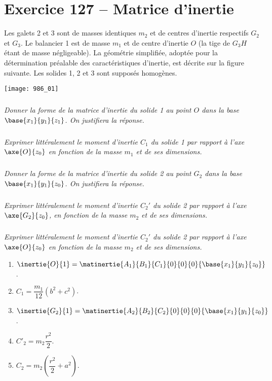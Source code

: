 \section*{Exercice 127 -- Matrice d'inertie}
\setcounter{exo}{0}

Les galets 2 et 3 sont de masses identiques $m_2$ et de centres d’inertie respectifs $G_2$ et $G_3$. Le balancier 1 est
de masse $m_1$ et de centre d’inertie $O$ (la tige de $G_3H$ étant de masse négligeable). La géométrie simplifiée,
adoptée pour la détermination préalable des caractéristiques d'inertie, est décrite sur la figure suivante.
Les solides 1, 2 et 3 sont supposés homogènes.

\begin{center}
\texttt{[image: 986\_01]}%
\end{center}


\subparagraph{}
\textit{Donner la forme de la matrice d’inertie du solide 1 au point $O$ dans la base
$\base{x_1}{y_1}{z_1}$. On justifiera la réponse.}
\ifprof
\begin{corrige}
\end{corrige}
\else
\fi

\subparagraph{}
\textit{Exprimer littéralement le moment d’inertie $C_1$ du solide 1 par rapport à l’axe $\axe{O}{z_0}$
 en fonction de la masse $m_1$ et de ses dimensions.}
\ifprof
\begin{corrige}
\end{corrige}
\else
\fi

\subparagraph{}
\textit{Donner la forme de la matrice d’inertie du solide 2 au point $G_2$ dans la base $\base{x_1}{y_1}{z_0}$. On justifiera la réponse.}
\ifprof
\begin{corrige}
\end{corrige}
\else
\fi

\subparagraph{}
\textit{Exprimer littéralement le moment d’inertie $C_2'$ du solide 2 par rapport à l’axe $\axe{G_2}{z_0}$, en fonction de la masse $m_2$ et de ses dimensions.}
\ifprof
\begin{corrige}
\end{corrige}
\else
\fi

\subparagraph{}
\textit{Exprimer littéralement le moment d’inertie $C_2'$ du solide 2 par rapport à l’axe $\axe{O}{z_0}$ en fonction de la masse $m_2$ et de ses dimensions.}
\ifprof
\begin{corrige}
\end{corrige}
\else
\fi
%

\begin{enumerate}
\item $\inertie{O}{1}=\matinertie{A_1}{B_1}{C_1}{0}{0}{0}{\base{x_1}{y_1}{z_0}}$.
\item $C_1 = \dfrac{m_1}{12}\left( b^2 + c^2\right)$.
\item $\inertie{G_2}{1}=\matinertie{A_2}{B_2}{C_2}{0}{0}{0}{\base{x_1}{y_1}{z_0}}$.
\item $C'_2 = m_2 \dfrac{r^2}{2}$.
\item $C_2 = m_2\left(\dfrac{r^2}{2}+a^2\right)$.
\end{enumerate}
